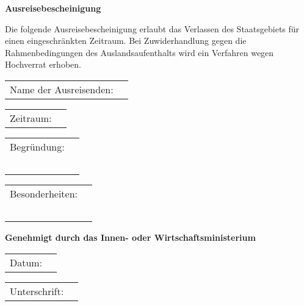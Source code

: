 \documentclass[12pt]{article}
\begin{document}
\textbf{\LARGE{Ausreisebescheinigung}}

\vspace{0.5cm}

Die folgende Ausreisebescheinigung erlaubt das Verlassen des Staatsgebiets für einen
eingeschränkten Zeitraum. Bei Zuwiderhandlung gegen die Rahmenbedingungen des Auslandsaufenthalts
wird ein Verfahren wegen Hochverrat erhoben.

\renewcommand{\arraystretch}{1.5}

\vspace{0.7cm}

\begin{tabular}{p{5cm}p{13cm}}
    Name der Ausreisenden: & \dotfill \\
\end{tabular}

\vspace{3mm}
\begin{tabular}{p{5cm}p{13cm}}
    Zeitraum: & \dotfill \\
\end{tabular}

\vspace{3mm}
\begin{tabular}{p{5cm}p{13cm}}
    Begründung: & \dotfill \\
    & \dotfill \\
    & \dotfill \\
    & \dotfill \\
    & \dotfill \\
    & \dotfill \\
\end{tabular}

\vspace{3mm}
\begin{tabular}{p{5cm}p{13cm}}
    Besonderheiten: & \dotfill \\
    & \dotfill \\
    & \dotfill \\
    & \dotfill \\
    & \dotfill \\
    & \dotfill \\
\end{tabular}
\vspace{8mm}

\textbf{Genehmigt durch das Innen- oder Wirtschaftsministerium}

\vspace{3mm}
\begin{tabular}{p{5cm}p{13cm}}
    Datum: & \dotfill \\
\end{tabular}

\vspace{3mm}
\begin{tabular}{p{5cm}p{13cm}}
    Unterschrift: & \dotfill \\
\end{tabular}
\end{document}
